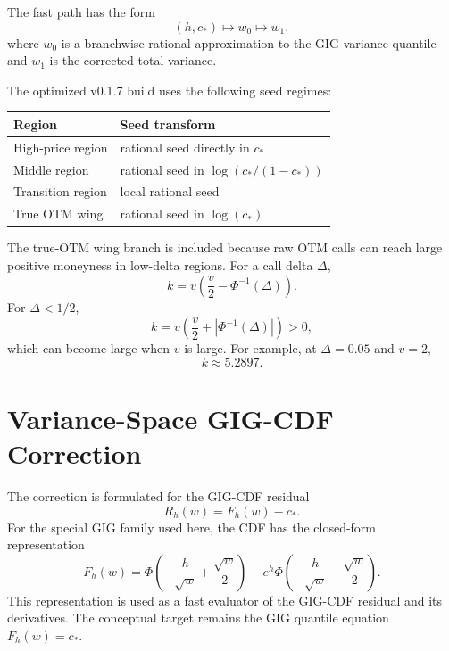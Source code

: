 \documentclass[11pt]{article}
\begin{document}
	The fast path has the form
	\begin{equation}
		(h,c_*) \longmapsto w_0 \longmapsto w_1,
	\end{equation}
	where $w_0$ is a branchwise rational approximation to the GIG variance quantile and $w_1$ is the corrected total variance.
	
	The optimized v0.1.7 build uses the following seed regimes:
	\begin{center}
		\begin{tabular}{ll}
			\toprule
			Region & Seed transform \\
			\midrule
			High-price region & rational seed directly in $c_*$ \\
			Middle region & rational seed in $\log(c_*/(1-c_*))$ \\
			Transition region & local rational seed \\
			True OTM wing & rational seed in $\log(c_*)$ \\
			\bottomrule
		\end{tabular}
	\end{center}
	
	The true-OTM wing branch is included because raw OTM calls can reach large positive moneyness in low-delta regions. For a call delta $\Delta$,
	\begin{equation}
		k = v\left(\frac{v}{2}-\Phi^{-1}(\Delta)\right).
	\end{equation}
	For $\Delta<1/2$,
	\begin{equation}
		k = v\left(\frac{v}{2}+|\Phi^{-1}(\Delta)|\right)>0,
	\end{equation}
	which can become large when $v$ is large. For example, at $\Delta=0.05$ and $v=2$,
	\begin{equation}
		k\approx 5.2897.
	\end{equation}
	
	\section{Variance-Space GIG-CDF Correction}
	
	The correction is formulated for the GIG-CDF residual
	\begin{equation}
		R_h(w)=F_h(w)-c_*.
	\end{equation}
	For the special GIG family used here, the CDF has the closed-form representation
	\begin{equation}
		F_h(w)=
		\Phi\left(-\frac{h}{\sqrt{w}}+\frac{\sqrt{w}}{2}\right)
		-e^h\Phi\left(-\frac{h}{\sqrt{w}}-\frac{\sqrt{w}}{2}\right).
	\end{equation}
	This representation is used as a fast evaluator of the GIG-CDF residual and its derivatives. The conceptual target remains the GIG quantile equation $F_h(w)=c_*$.
	
\end{document}
